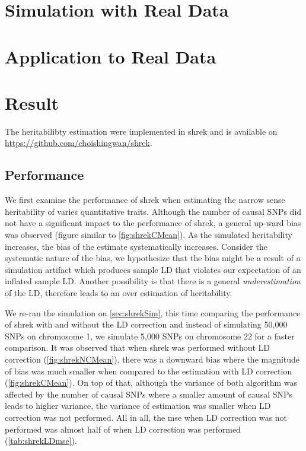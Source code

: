 	\section{Simulation with Real Data}
	\section{Application to Real Data}
	
	
	\section{Result}
		The heritabilibty estimation were implemented in \gls{shrek} and is available on \url{https://github.com/choishingwan/shrek}.  
		\subsection{Performance}
		We first examine the performance of \gls{shrek} when estimating the narrow sense heritability of varies quantitative traits. 
		Although the number of causal \glspl{SNP} did not have a significant impact to the performance of \gls{shrek}, a general up-ward bias was observed (figure similar to \cref{fig:shrekCMean}). 
		As the simulated heritability increases, the bias of the estimate systematically increases.
		Consider the systematic nature of the bias, we hypothesize that the bias might be a result of a simulation artifact which produces sample \gls{LD} that violates our expectation of an inflated sample \gls{LD}.
		Another possibility is that there is a general \emph{underestimation} of the \gls{LD}, therefore leads to an over estimation of heritability.
		
		We re-ran the simulation on \cref{sec:shrekSim}, this time comparing the performance of \gls{shrek} with and without the \gls{LD} correction and instead of simulating 50,000 \glspl{SNP} on chromosome 1, we simulate 5,000 \glspl{SNP} on chromosome 22 for a faster comparison.
		It was observed that when \gls{shrek} was performed without \gls{LD} correction (\cref{fig:shrekNCMean}), there was a downward bias where the magnitude of bias was much smaller when compared to the estimation with \gls{LD} correction (\cref{fig:shrekCMean}). 
		On top of that, although the variance of both algorithm was affected by the number of causal \glspl{SNP} where a smaller amount of causal \glspl{SNP} leads to higher variance, the variance of estimation was smaller when \gls{LD} correction was not performed.
		All in all, the \gls{mse} when \gls{LD} correction was not performed was almost half of when \gls{LD} correction was performed (\cref{tab:shrekLDmse}).
		
